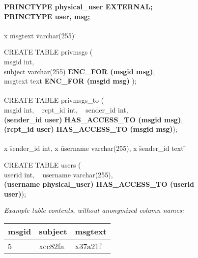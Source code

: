 \renewcommand{\FrameSep}{0.05in}
\begin{figure}[t!]
\begin{framed}
\footnotesize

\begin{tabbing}
{\bf PRINCTYPE physical\_user EXTERNAL;} \\
{\bf PRINCTYPE user, msg;} \\
\\

x \= msgtext \= varchar(255) \= \kill

CREATE TABLE privmsgs (\\
\> msgid \> int, \\
\> subject \> varchar(255) \> {\bf ENC\_FOR (msgid msg)}, \\
\> msgtext \> text \> {\bf ENC\_FOR (msgid msg)} ); \\
\\

CREATE TABLE privmsgs\_to (\\
\> msgid int, ~ rcpt\_id int, ~ sender\_id int, \\

\> {\bf (sender\_id user)} \= {\bf HAS\_ACCESS\_TO (msgid msg)}, \\
\> {\bf (rcpt\_id user)} \> {\bf HAS\_ACCESS\_TO (msgid msg)}); \\
\\

x \= sender\_id  int, x \= username varchar(255), x \= sender\_id text \= \kill

CREATE TABLE users (\\
\> userid int, ~ username varchar(255), \\
\> {\bf (username physical\_user) HAS\_ACCESS\_TO (userid user)});

\end{tabbing}

\vspace{-4mm}
\hrulefill
\vspace{-2mm}

\begin{center}
\textit{Example table contents, without anonymized column names:}
\end{center}
 \hspace{1mm}
 \begin{minipage}[h]{1.7 in}
  \centering
  \begin{tabular}{p{0.8cm}|p{1cm}|p{0.8cm}}
  msgid & subject & msgtext \\ \hline
  5 & xcc82fa & x37a21f \\ 
  \end{tabular}


\end{minipage}
\end{framed}
\end{figure}
